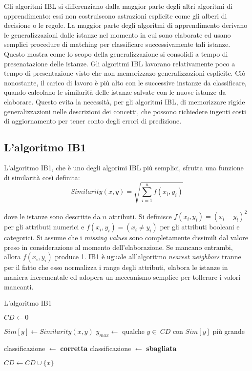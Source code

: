 Gli algoritmi IBL si differenziano dalla maggior parte degli altri algoritmi di apprendimento: essi non costruiscono astrazioni esplicite come gli alberi di decisione o le regole. La maggior parte degli algoritmi di apprendimento derivano le generalizzazioni dalle istanze nel momento in cui sono elaborate ed usano semplici procedure di matching per classificare successivamente tali istanze. Questo mostra come lo scopo della generalizzazione si consolidi a tempo di presenatazione delle istanze. Gli algoritmi IBL lavorano relativamente poco a tempo di presentazione visto che non memorizzazo generalizzazioni esplicite. Ciò nonostante, il carico di lavoro è più alto con le successive instanze da classificare, quando calcolano le similarità delle istanze salvate con le nuove istanze da elaborare. Questo evita la necessità, per gli algoritmi IBL, di memorizzare rigide generalizzazioni nelle descrizioni dei concetti, che possono richiedere ingenti costi di aggiornamento per tener conto degli errori di predizione.

\subsection{L'algoritmo IB1}
L'algoritmo IB1, che è uno degli algorimi IBL più semplici, sfrutta una funzione di similarità così definita:
$$ Similarity(x, y)=\sqrt{\sum\limits_{i=1}^n f(x_i, y_i) } $$

dove le istanze sono descritte da $ n $ attributi. Si definisce $ f(x_i, y_i) = (x_i - y_i)^2 $ per gli attributi numerici e $ f(x_i, y_i) = (x_i \neq y_i) $ per gli attributi booleani e categorici. Si assume che i \emph{missing values} sono completamente dissimili dal valore preso in considerazione al momento dell'elaborazione. Se mancano entrambi, allora $ f(x_i, y_i) $ produce 1. IB1 è uguale all'algoritmo \emph{nearest neighbors} tranne per il fatto che esso normalizza i range degli attributi, elabora le istanze in maniera incrementale ed adopera un meccanismo semplice per tollerare i valori mancanti.


\begin{algorithm}[!htb]
\caption{L'algoritmo IB1}
\begin{algorithmic}[1]
	\State $CD \gets 0$
  	
    	\State $Sim[y] \gets Similarity(x, y)$
        \State $y_{max} \gets $ qualche $ y \in \  CD $ con $ Sim[y] $ più grande
    \EndFor
    
    	\State classificazione $\gets$ \textbf{corretta}
    \Else
    	\State classificazione $\gets$ \textbf{sbagliata}
    \EndIf
    
    \State $CD \gets CD \cup \{x\} $
  \EndFor
\end{algorithmic}
\end{algorithm}

